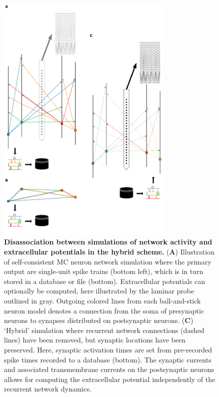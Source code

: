 \begin{figure}[!ht]
\begin{center}
\includegraphics[width=0.75\textwidth]{Figures/Ch-LFPy/Ch-LFPy-hybrid.pdf}
\end{center}
\caption{\textbf{Disassociation between simulations of network activity and extracellular potentials in the hybrid scheme.}
({\bf A}) Illustration of self-consistent MC neuron network simulation where the primary output are single-unit spike trains (bottom left),
which is in turn stored in a database or file (bottom).
Extracellular potentials can optionally be computed,
here illustrated by the laminar probe outlined in gray.
Outgoing colored lines from each ball-and-stick neuron model denotes a connection from the soma of presynaptic neurons to synapses distributed on postsynaptic neurons.
({\bf C}) `Hybrid' simulation where recurrent network connections (dashed lines) have been removed,
but synaptic locations have been preserved.
Here, synaptic activation times are set from pre-recorded spike times recorded to a database (bottom).
The synaptic currents and associated transmembrane currents on the postsynaptic neurons allows for computing the extracellular potential independently of the recurrent network dynamics.
}
\label{fig:LFPy_hybrid}
\end{figure}


